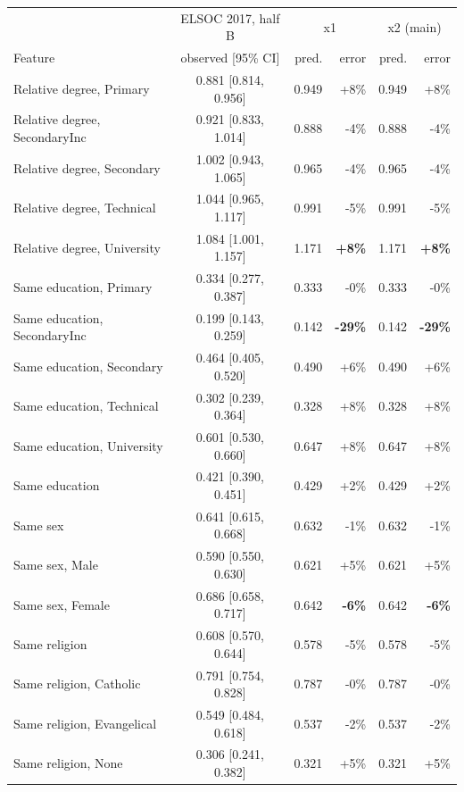 \begin{tabular}{lcrrrr}
\hline
 & ELSOC 2017, half B & \multicolumn{2}{c}{x1} & \multicolumn{2}{c}{x2 (main)} \\
Feature & observed [95\% CI] & pred. & error & pred. & error \\
\hline
Relative degree, Primary & 0.881 [0.814, 0.956] & 0.949 & +8\% & 0.949 & +8\% \\
Relative degree, SecondaryInc & 0.921 [0.833, 1.014] & 0.888 & -4\% & 0.888 & -4\% \\
Relative degree, Secondary & 1.002 [0.943, 1.065] & 0.965 & -4\% & 0.965 & -4\% \\
Relative degree, Technical & 1.044 [0.965, 1.117] & 0.991 & -5\% & 0.991 & -5\% \\
Relative degree, University & 1.084 [1.001, 1.157] & 1.171 & \textbf{+8\%} & 1.171 & \textbf{+8\%} \\
Same education, Primary & 0.334 [0.277, 0.387] & 0.333 & -0\% & 0.333 & -0\% \\
Same education, SecondaryInc & 0.199 [0.143, 0.259] & 0.142 & \textbf{-29\%} & 0.142 & \textbf{-29\%} \\
Same education, Secondary & 0.464 [0.405, 0.520] & 0.490 & +6\% & 0.490 & +6\% \\
Same education, Technical & 0.302 [0.239, 0.364] & 0.328 & +8\% & 0.328 & +8\% \\
Same education, University & 0.601 [0.530, 0.660] & 0.647 & +8\% & 0.647 & +8\% \\
Same education & 0.421 [0.390, 0.451] & 0.429 & +2\% & 0.429 & +2\% \\
Same sex & 0.641 [0.615, 0.668] & 0.632 & -1\% & 0.632 & -1\% \\
Same sex, Male & 0.590 [0.550, 0.630] & 0.621 & +5\% & 0.621 & +5\% \\
Same sex, Female & 0.686 [0.658, 0.717] & 0.642 & \textbf{-6\%} & 0.642 & \textbf{-6\%} \\
Same religion & 0.608 [0.570, 0.644] & 0.578 & -5\% & 0.578 & -5\% \\
Same religion, Catholic & 0.791 [0.754, 0.828] & 0.787 & -0\% & 0.787 & -0\% \\
Same religion, Evangelical & 0.549 [0.484, 0.618] & 0.537 & -2\% & 0.537 & -2\% \\
Same religion, None & 0.306 [0.241, 0.382] & 0.321 & +5\% & 0.321 & +5\% \\

\end{tabular}
